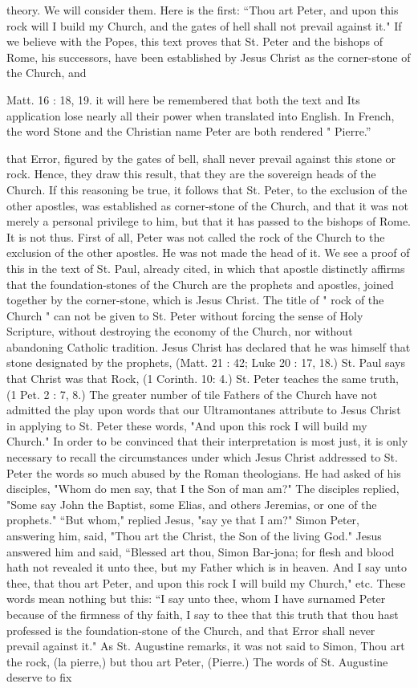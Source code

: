 theory. We will consider them. Here is the first: “Thou art Peter, and upon this rock will I build my Church, and the gates of hell shall not prevail against it." If we believe with the Popes, this text proves that St. Peter and the bishops of Rome, his successors, have been established by Jesus Christ as the corner-stone of the Church, and

Matt. 16 : 18, 19. it will here be remembered that both the text and Its application lose nearly all their power when translated into English. In French, the word Stone and the Christian name Peter are both rendered " Pierre.”

that Error, figured by the gates of bell, shall never prevail against this stone or rock. Hence, they draw this result, that they are the sovereign heads of the Church. If this reasoning be true, it follows that St. Peter, to the exclusion of the other apostles, was established as corner-stone of the Church, and that it was not merely a personal privilege to him, but that it has passed to the bishops of Rome. It is not thus. First of all, Peter was not called the rock of the Church to the exclusion of the other apostles. He was not made the head of it. We see a proof of this in the text of St. Paul, already cited, in which that apostle distinctly affirms that the foundation-stones of the Church are the prophets and apostles, joined together by the corner-stone, which is Jesus Christ. The title of " rock of the Church " can not be given to St. Peter without forcing the sense of Holy Scripture, without destroying the economy of the Church, nor without abandoning Catholic tradition. Jesus Christ has declared that he was himself that stone designated by the prophets, (Matt. 21 : 42; Luke 20 : 17, 18.) St. Paul says that Christ was that Rock, (1 Corinth. 10: 4.) St. Peter teaches the same truth, (1 Pet. 2 : 7, 8.) The greater number of tile Fathers of the Church have not admitted the play upon words that our Ultramontanes attribute to Jesus Christ in applying to St. Peter these words, "And upon this rock I will build my Church." In order to be convinced that their interpretation is most just, it is only necessary to recall the circumstances under which Jesus Christ addressed to St. Peter the words so much abused by the Roman theologians. He had asked of his disciples, "Whom do men say, that I the Son of man am?" The disciples replied, "Some say John the Baptist, some Elias, and others Jeremias, or one of the prophets." “But whom," replied Jesus, "say ye that I am?" Simon Peter, answering him, said, "Thou art the Christ, the Son of the living God." Jesus answered him and said, “Blessed art thou, Simon Bar-jona; for flesh and blood hath not revealed it unto thee, but my Father which is in heaven. And I say unto thee, that thou art Peter, and upon this rock I will build my Church," etc. These words mean nothing but this: “I say unto thee, whom I have surnamed Peter because of the firmness of thy faith, I say to thee that this truth that thou hast professed is the foundation-stone of the Church, and that Error shall never prevail against it." As St. Augustine remarks, it was not said to Simon, Thou art the rock, (la pierre,) but thou art Peter, (Pierre.) The words of St. Augustine deserve to fix 